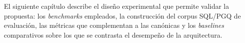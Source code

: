 El siguiente capítulo describe el diseño experimental que permite validar la propuesta: los \emph{benchmarks} empleados, la construcción del corpus \ac{SQL}/\ac{PGQ} de evaluación, las métricas que complementan a las canónicas y los \emph{baselines} comparativos sobre los que se contrasta el desempeño de la arquitectura.

%
%
%
%
%
%
